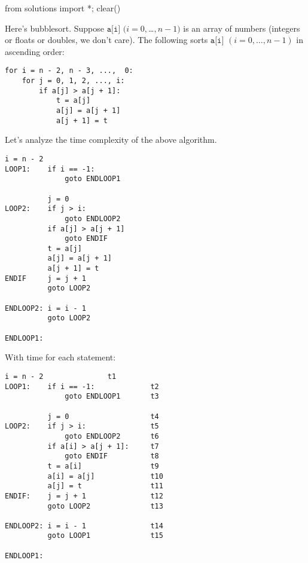 \begin{python0}
from solutions import *; clear()
\end{python0}


Here's bubblesort. Suppose $\texttt{a[i]}$ $(i=0,
$\ldots$, n-1)$ is an array of numbers (integers or floats or
doubles, we don't care). The following sorts $\texttt{a[i]}$
$(i=0,\ldots,n-1)$ in ascending order:
\begin{Verbatim}[frame=single, fontsize=\footnotesize]
for i = n - 2, n - 3, ...,  0:
    for j = 0, 1, 2, ..., i:
        if a[j] > a[j + 1]:
            t = a[j]
            a[j] = a[j + 1]
            a[j + 1] = t
\end{Verbatim}


Let's analyze the time complexity of the above algorithm.

\begin{Verbatim}[frame=single, fontsize=\footnotesize]
          i = n - 2
LOOP1:    if i == -1:
              goto ENDLOOP1

          j = 0
LOOP2:    if j > i:
              goto ENDLOOP2
          if a[j] > a[j + 1]
              goto ENDIF    
          t = a[j]
          a[j] = a[j + 1]
          a[j + 1] = t
ENDIF     j = j + 1
          goto LOOP2

ENDLOOP2: i = i - 1
          goto LOOP2

ENDLOOP1:
\end{Verbatim}

With time for each statement:
\begin{Verbatim}[frame=single, fontsize=\footnotesize]
          i = n - 2               t1
LOOP1:    if i == -1:             t2
              goto ENDLOOP1       t3

          j = 0                   t4
LOOP2:    if j > i:               t5
              goto ENDLOOP2       t6
          if a[i] > a[j + 1]:     t7
              goto ENDIF          t8   
          t = a[i]                t9
          a[i] = a[j]             t10
          a[j] = t                t11
ENDIF:    j = j + 1               t12
          goto LOOP2              t13

ENDLOOP2: i = i - 1               t14
          goto LOOP1              t15

ENDLOOP1:
\end{Verbatim}

